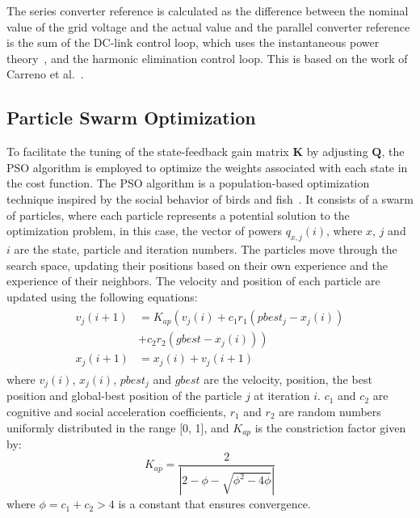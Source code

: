 The series converter reference is calculated as the difference between the nominal value of the grid voltage and the actual value and the parallel converter reference is the sum of the DC-link control loop, which uses the instantaneous power theory~\cite{akagiControlStrategyActive1986}, and the harmonic elimination control loop. This is based on the work of Carreno et al.~\cite{carrenoStateFeedbackControlHybrid2024}.

\subsection{Particle Swarm Optimization}

To facilitate the tuning of the state-feedback gain matrix $\mathbf{K}$ by adjusting $\mathbf{Q}$, the PSO algorithm is employed to optimize the weights associated with each state in the cost function. The PSO algorithm is a population-based optimization technique inspired by the social behavior of birds and fish~\cite{clercSwarmQueenDeterministic1999}. It consists of a swarm of particles, where each particle represents a potential solution to the optimization problem, in this case, the vector of powers $q_{x,j}(i)$, where $x$, $j$ and $i$ are the state, particle and iteration numbers. The particles move through the search space, updating their positions based on their own experience and the experience of their neighbors. The velocity and position of each particle are updated using the following equations:
\begin{align}
    \begin{aligned}
        v_j(i + 1) &= K_{ap}\left(v_j(i) + c_1 r_1 (pbest_j - x_j(i)) \right.\\
        & \left. + c_2 r_2 (gbest - x_j(i))\right)\\
        x_j(i + 1) &= x_j(i) + v_j(i + 1)
    \end{aligned}
\end{align}
where $v_j(i)$, $x_j(i)$, $pbest_j$ and $gbest$ are the velocity, position, the best position and global-best position of the particle $j$ at iteration $i$. $c_1$ and $c_2$ are cognitive and social acceleration coefficients, $r_1$ and $r_2$ are random numbers uniformly distributed in the range [0, 1], and $K_{ap}$ is the constriction factor given by:
\begin{equation}
    K_{ap} = \dfrac{2}{\left|2 - \phi - \sqrt{\phi^2 - 4\phi}\right|}
\end{equation}
where $\phi = c_1 + c_2 > 4$ is a constant that ensures convergence.

